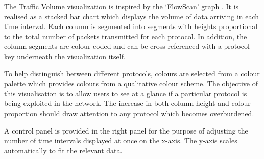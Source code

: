 The Traffic Volume visualization is inspired by the `FlowScan' graph
\cite{plonka2000flowscan}. It is realised as a stacked
bar chart which displays the volume of data arriving in each time interval.
Each column is segmented into segments with heights proportional to the total
number of packets transmitted for each protocol.
In addition, the column segments are colour-coded and can be cross-referenced
with a protocol key underneath the visualization itself.

To help distinguish between different protocols, colours are selected from a
colour palette which provides colours from a qualitative colour scheme.
The objective of this visualisation is to allow users to see at a glance if a
particular protocol is being exploited in the network. The increase in both
column height and colour proportion should draw attention to any protocol which
becomes overburdened.

A control panel is provided in the right panel for the purpose of adjusting the
number of time intervals displayed at once on the x-axis. The y-axis scales
automatically to fit the relevant data.

